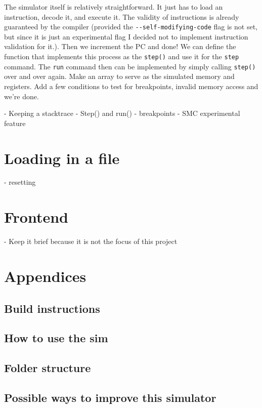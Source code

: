 \documentclass[12pt]{article}
\begin{document}
	The simulator itself is relatively straightforward. It just has to load an instruction, decode it, and execute it. The validity of instructions is already guaranteed by the compiler (provided the \verb|--self-modifying-code| flag is not set, but since it is just an experimental flag I decided not to implement instruction validation for it.). Then we increment the PC and done! We can define the function that implements this process as the \verb|step()| and use it for the \verb|step| command. The \verb|run| command then can be implemented by simply calling \verb|step()| over and over again. Make an array to serve as the simulated memory and registers. Add a few conditions to test for breakpoints, invalid memory access and we're done.

	- Keeping a stacktrace
	- Step() and run()
	- breakpoints
	- SMC experimental feature

	\section{Loading in a file}

	- resetting

	\section{Frontend}

	- Keep it brief because it is not the focus of this project

	\section{Appendices}
	
	\subsection{Build instructions}
	\subsection{How to use the sim}
	\subsection{Folder structure}
	\subsection{Possible ways to improve this simulator}
    
\end{document}
